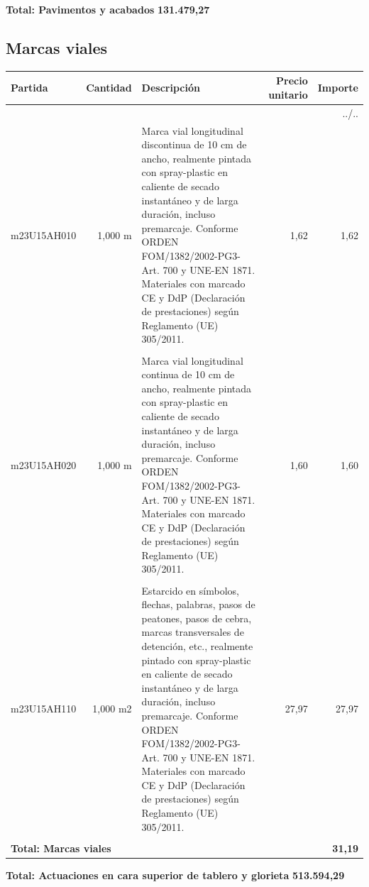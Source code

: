 \documentclass{book}%
\begin{document}
%
\noindent%
\large%
\textbf{Total: Pavimentos y acabados }%
\dotfill%
\textbf{131.479,27}%
\newline%
\normalsize

%
\subsection{Marcas viales}%
\small%
\begin{longtable}{lrlrr}%
Partida&Cantidad&Descripción&\multicolumn{1}{p{1.5cm}}{Precio unitario}&Importe\\%
\hline%
\endhead%
\multicolumn{5}{r}{../..}\\%
\endfoot%
\hline%
\endlastfoot%
m23U15AH010&     1,000 m&\multicolumn{1}{p{5cm}}{Marca vial longitudinal discontinua de 10 cm de ancho, realmente pintada con spray{-}plastic en caliente de secado instantáneo y de larga duración, incluso premarcaje. Conforme ORDEN FOM/1382/2002{-}PG3{-}Art. 700 y UNE{-}EN 1871. Materiales con marcado CE y DdP (Declaración de prestaciones) según Reglamento (UE) 305/2011.}&      1,62&1,62\\%
&&&&\\%
m23U15AH020&     1,000 m&\multicolumn{1}{p{5cm}}{Marca vial longitudinal continua de 10 cm de ancho, realmente pintada con spray{-}plastic en caliente de secado instantáneo y de larga duración, incluso premarcaje. Conforme ORDEN FOM/1382/2002{-}PG3{-}Art. 700 y UNE{-}EN 1871. Materiales con marcado CE y DdP (Declaración de prestaciones) según Reglamento (UE) 305/2011.}&      1,60&1,60\\%
&&&&\\%
m23U15AH110&     1,000 m2&\multicolumn{1}{p{5cm}}{Estarcido en símbolos, flechas, palabras, pasos de peatones, pasos de cebra, marcas transversales de detención, etc., realmente pintado con spray{-}plastic en caliente de secado instantáneo y de larga duración, incluso premarcaje. Conforme ORDEN FOM/1382/2002{-}PG3{-}Art. 700 y UNE{-}EN 1871. Materiales con marcado CE y DdP (Declaración de prestaciones) según Reglamento (UE) 305/2011.}&     27,97&27,97\\%
&&&&\\%
\multicolumn{4}{p{8cm}}{\textbf{Total: Marcas viales}}&\textbf{31,19}\\%
\end{longtable}%
\normalsize

%
\noindent%
\large%
\textbf{Total: Actuaciones en cara superior de tablero y glorieta }%
\dotfill%
\textbf{513.594,29}%
\newline%
\normalsize
\end{document}
